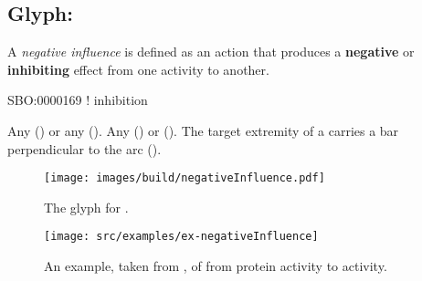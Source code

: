 \subsection{Glyph: }
\label{sec:af:negative_infl}

A \emph{negative influence} is defined as an action that produces a \textbf{negative} or \textbf{inhibiting} effect from one activity to another.

\begin{glyphDescription}

\glyphSboTerm SBO:0000169 ! inhibition

 \glyphOrigin Any  () or any  ().
 \glyphTarget Any  () or  ().
 \glyphEndPoint The target extremity of a  carries a bar perpendicular to the arc ().

\end{glyphDescription}

\begin{figure}[H]
  \centering
  \texttt{[image: images/build/negativeInfluence.pdf]}
  \caption{The \AF glyph for .}
  \label{fig:af:negativeInfl}
\end{figure}

\begin{figure}[H]
  \centering
  \texttt{[image: src/examples/ex-negativeInfluence]}
  \caption{An example, taken from , of  from  protein activity to  activity.}
  \label{fig:af:ex-NI}
\end{figure} 